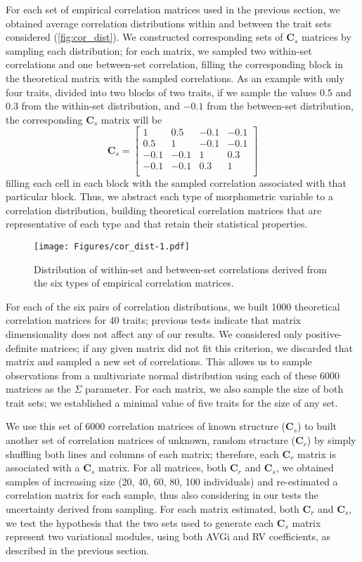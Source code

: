 \documentclass[11pt,twoside]{report}
\begin{document}
For each set of empirical correlation matrices used in the previous
section, we obtained average correlation distributions within and
between the trait sets considered (\autoref{fig:cor_dist}). We
constructed corresponding sets of $\mathbf{C}_{s}$ matrices by sampling
each distribution; for each matrix, we sampled two within-set
correlations and one between-set correlation, filling the corresponding
block in the theoretical matrix with the sampled correlations. As an
example with only four traits, divided into two blocks of two traits, if
we sample the values $0.5$ and $0.3$ from the within-set distribution,
and $-0.1$ from the between-set distribution, the corresponding
$\mathbf{C}_{s}$ matrix will be \[
\mathbf{C}_s =
\begin{bmatrix}
1 & 0.5 & -0.1 & -0.1 \\
0.5 & 1 & -0.1 & -0.1 \\
-0.1 & -0.1 & 1 & 0.3 \\
-0.1 & -0.1 & 0.3 & 1 \\
\end{bmatrix}
\] filling each cell in each block with the sampled correlation
associated with that particular block. Thus, we abstract each type of
morphometric variable to a correlation distribution, building
theoretical correlation matrices that are representative of each type
and that retain their statistical properties.

\begin{figure}[htbp]
\centering
\texttt{[image: Figures/cor\_dist-1.pdf]}
\caption{Distribution of within-set and between-set correlations derived
from the six types of empirical correlation matrices.
\label{fig:cor_dist}}
\end{figure}

For each of the six pairs of correlation distributions, we built 1000
theoretical correlation matrices for 40 traits; previous tests indicate
that matrix dimensionality does not affect any of our results. We
considered only positive-definite matrices; if any given matrix did not
fit this criterion, we discarded that matrix and sampled a new set of
correlations. This allows us to sample observations from a multivariate
normal distribution using each of these 6000 matrices as the $\Sigma$
parameter. For each matrix, we also sample the size of both trait sets;
we established a minimal value of five traits for the size of any set.

We use this set of 6000 correlation matrices of known structure
($\mathbf{C}_s$) to built another set of correlation matrices of
unknown, random structure ($\mathbf{C}_r$) by simply shuffling both
lines and columns of each matrix; therefore, each $\mathbf{C}_r$ matrix
is associated with a $\mathbf{C}_s$ matrix. For all matrices, both
$\mathbf{C}_r$ and $\mathbf{C}_s$, we obtained samples of increasing
size (20, 40, 60, 80, 100 individuals) and re-estimated a correlation
matrix for each sample, thus also considering in our tests the
uncertainty derived from sampling. For each matrix estimated, both
$\mathbf{C}_r$ and $\mathbf{C}_s$, we test the hypothesis that the two
sets used to generate each $\mathbf{C}_s$ matrix represent two
variational modules, using both AVGi and RV coefficients, as described
in the previous section.
\end{document}
